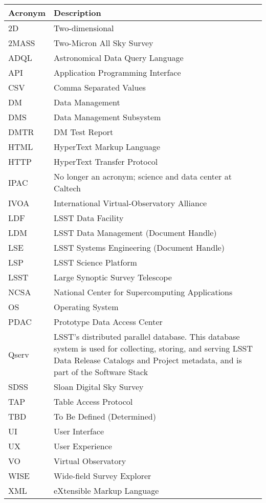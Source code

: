 \addtocounter{table}{-1}
\begin{longtable}{p{}p{}}\hline
\textbf{Acronym} & \textbf{Description}  \\\hline

2D & Two-dimensional \\\hline
2MASS & Two-Micron All Sky Survey \\\hline
ADQL & Astronomical Data Query Language \\\hline
API & Application Programming Interface \\\hline
CSV & Comma Separated Values \\\hline
DM & Data Management \\\hline
DMS & Data Management Subsystem \\\hline
DMTR & DM Test Report \\\hline
HTML & HyperText Markup Language \\\hline
HTTP & HyperText Transfer Protocol \\\hline
IPAC & No longer an acronym; science and data center at Caltech \\\hline
IVOA & International Virtual-Observatory Alliance \\\hline
LDF & LSST Data Facility \\\hline
LDM & LSST Data Management (Document Handle) \\\hline
LSE & LSST Systems Engineering (Document Handle) \\\hline
LSP & LSST Science Platform \\\hline
LSST & Large Synoptic Survey Telescope \\\hline
NCSA & National Center for Supercomputing Applications \\\hline
OS & Operating System \\\hline
PDAC & Prototype Data Access Center \\\hline
Qserv & LSST's distributed parallel database. This database system is used for collecting, storing, and serving LSST Data Release Catalogs and Project metadata, and is part of the Software Stack \\\hline
SDSS & Sloan Digital Sky Survey \\\hline
TAP & Table Access Protocol \\\hline
TBD & To Be Defined (Determined) \\\hline
UI & User Interface \\\hline
UX & User Experience \\\hline
VO & Virtual Observatory \\\hline
WISE & Wide-field Survey Explorer \\\hline
XML & eXtensible Markup Language \\\hline
\end{longtable}
